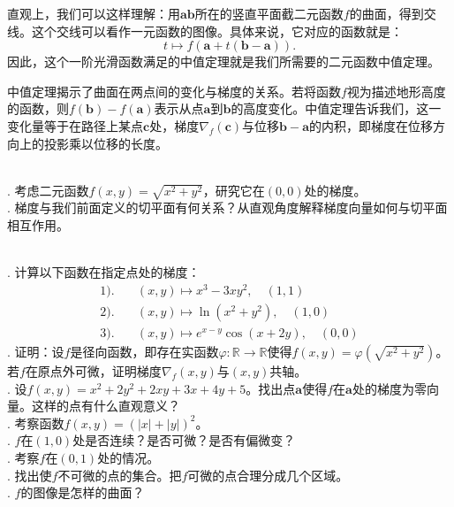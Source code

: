 \documentclass[12pt,UTF8]{ctexbook}
\begin{document}
直观上，我们可以这样理解：用$\mathbf{ab}$所在的竖直平面截二元函数$f$的曲面，得到交线。这个交线可以看作一元函数的图像。具体来说，它对应的函数就是：
$$ t\mapsto f(\mathbf{a} + t(\mathbf{b} - \mathbf{a})). $$
因此，这个一阶光滑函数满足的中值定理就是我们所需要的二元函数中值定理。

中值定理揭示了曲面在两点间的变化与梯度的关系。若将函数$f$视为描述地形高度的函数，则$f(\mathbf{b})-f(\mathbf{a})$表示从点$\mathbf{a}$到$\mathbf{b}$的高度变化。中值定理告诉我们，这一变化量等于在路径上某点$\mathbf{c}$处，梯度$\nabla_f(\mathbf{c})$与位移$\mathbf{b}-\mathbf{a}$的内积，即梯度在位移方向上的投影乘以位移的长度。

\begin{sk}
\mbox{}\\
. 考虑二元函数$f(x,y) = \sqrt{x^2 + y^2}$，研究它在$(0,0)$处的梯度。\\
. 梯度与我们前面定义的切平面有何关系？从直观角度解释梯度向量如何与切平面相互作用。
\end{sk}

\begin{xt}
\mbox{}\\
. 计算以下函数在指定点处的梯度：
\begin{align*}
1).& \quad (x,y) \mapsto x^3 - 3xy^2, \quad (1,1) \\
2).& \quad (x,y) \mapsto \ln(x^2 + y^2), \quad (1,0) \\
3).& \quad (x,y) \mapsto e^{x-y}\cos(x+2y), \quad (0,0)
\end{align*}
. 证明：设$f$是径向函数，即存在实函数$\varphi:\mathbb{R}\rightarrow \mathbb{R}$使得$f(x,y) = \varphi(\sqrt{x^2 + y^2})$。若$f$在原点外可微，证明梯度$\nabla_f(x,y)$与$(x,y)$共轴。\\
. 设$f(x,y) = x^2 + 2y^2 + 2xy + 3x + 4y + 5$。找出点$\mathbf{a}$使得$f$在$\mathbf{a}$处的梯度为零向量。这样的点有什么直观意义？\\
. 考察函数$f(x,y) = (|x| + |y|)^2$。\\
. $f$在$(1,0)$处是否连续？是否可微？是否有偏微变？\\
. 考察$f$在$(0,1)$处的情况。\\
. 找出使$f$不可微的点的集合。把$f$可微的点合理分成几个区域。\\
. $f$的图像是怎样的曲面？
\end{xt}
\end{document}
